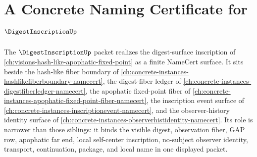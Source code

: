 \chapter{A Concrete Naming Certificate for $\DigestInscriptionUp$}
\label{ch:concrete-instances-digest-inscription-namecert}

The $\DigestInscriptionUp$ packet realizes the digest-surface inscription of \autoref{ch:visions-hash-like-apophatic-fixed-point} as a finite NameCert surface. It sits beside the hash-like fiber boundary of \autoref{ch:concrete-instances-hashlikefiberboundary-namecert}, the digest-fiber ledger of \autoref{ch:concrete-instances-digestfiberledger-namecert}, the apophatic fixed-point fiber of \autoref{ch:concrete-instances-apophatic-fixed-point-fiber-namecert}, the inscription event surface of \autoref{ch:concrete-instances-inscriptionevent-namecert}, and the observer-history identity surface of \autoref{ch:concrete-instances-observerhistidentity-namecert}. Its role is narrower than those siblings: it binds the visible digest, observation fiber, GAP row, apophatic far end, local self-center inscription, no-subject observer identity, transport, continuation, package, and local name in one displayed packet.

